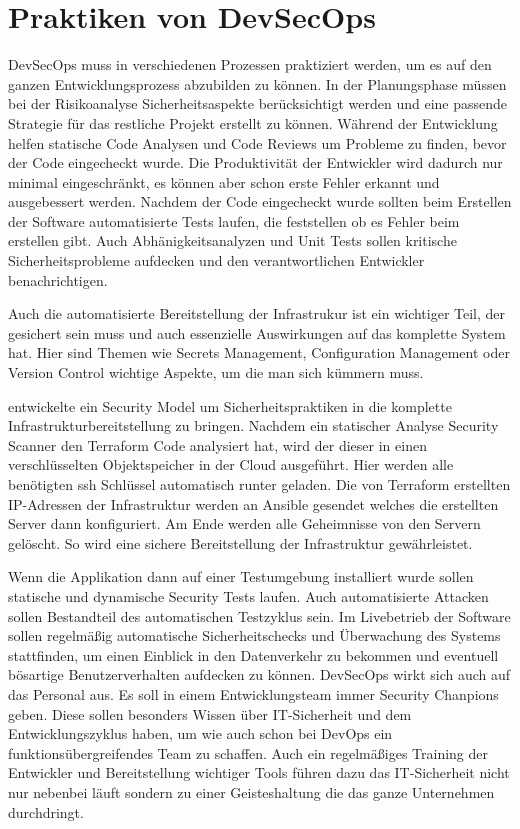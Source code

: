\section{Praktiken von DevSecOps}
DevSecOps muss in verschiedenen Prozessen praktiziert werden, um es auf den ganzen Entwicklungsprozess abzubilden zu können.
In der Planungsphase müssen bei der Risikoanalyse Sicherheitsaspekte berücksichtigt werden und eine passende Strategie für das restliche Projekt erstellt zu können.
Während der Entwicklung helfen statische Code Analysen und Code Reviews um Probleme zu finden, bevor der Code eingecheckt wurde. Die Produktivität der Entwickler wird dadurch nur minimal eingeschränkt, es können aber schon erste Fehler erkannt und ausgebessert werden.
Nachdem der Code eingecheckt wurde sollten beim Erstellen der Software automatisierte Tests laufen, die feststellen ob es Fehler beim erstellen gibt. Auch Abhänigkeitsanalyzen und Unit Tests sollen kritische Sicherheitsprobleme aufdecken und den verantwortlichen Entwickler benachrichtigen.

Auch die automatisierte Bereitstellung der Infrastrukur ist ein wichtiger Teil, der gesichert sein muss und auch essenzielle Auswirkungen auf das komplette System hat.
Hier sind Themen wie Secrets Management, Configuration Management oder Version Control wichtige Aspekte, um die man sich kümmern muss.\cite{grey}

\cite{security-model} entwickelte ein Security Model um Sicherheitspraktiken in die komplette Infrastrukturbereitstellung zu bringen. Nachdem ein statischer Analyse Security Scanner den Terraform Code analysiert hat, wird der dieser in einen verschlüsselten Objektspeicher in der Cloud ausgeführt. Hier werden alle benötigten \ac{ssh} Schlüssel automatisch runter geladen. Die von Terraform erstellten IP-Adressen der Infrastruktur werden an Ansible gesendet welches die erstellten Server dann konfiguriert. Am Ende werden alle Geheimnisse von den Servern gelöscht. So wird eine sichere Bereitstellung der Infrastruktur gewährleistet.

Wenn die Applikation dann auf einer Testumgebung installiert wurde sollen statische und dynamische Security Tests laufen. Auch automatisierte Attacken sollen Bestandteil des automatischen Testzyklus sein.
Im Livebetrieb der Software sollen regelmäßig automatische Sicherheitschecks und Überwachung des Systems stattfinden, um einen Einblick in den Datenverkehr zu bekommen und eventuell bösartige Benutzerverhalten aufdecken zu können.
DevSecOps wirkt sich auch auf das Personal aus. Es soll in einem Entwicklungsteam immer \glqq Security Chanpions\grqq \cite{grey} geben. Diese sollen besonders Wissen über IT-Sicherheit und dem Entwicklungszyklus haben, um wie auch schon bei DevOps ein funktionsübergreifendes Team zu schaffen.
Auch ein regelmäßiges Training der Entwickler und Bereitstellung wichtiger Tools führen dazu das IT-Sicherheit nicht nur nebenbei läuft sondern zu einer Geisteshaltung die das ganze Unternehmen durchdringt.

